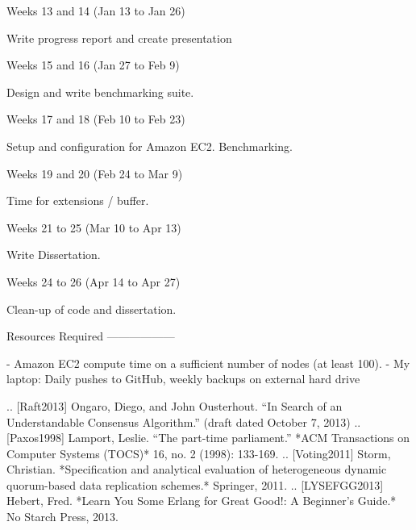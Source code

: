 Weeks 13 and 14 (Jan 13 to Jan 26)
~~~~~~~~~~~~~~~~~~~~~~~~~~~~~~~~~~

Write progress report and create presentation

Weeks 15 and 16 (Jan 27 to Feb 9)
~~~~~~~~~~~~~~~~~~~~~~~~~~~~~~~~~

Design and write benchmarking suite.

Weeks 17 and 18 (Feb 10 to Feb 23)
~~~~~~~~~~~~~~~~~~~~~~~~~~~~~~~~~~

Setup and configuration for Amazon EC2. Benchmarking.

Weeks 19 and 20 (Feb 24 to Mar 9)
~~~~~~~~~~~~~~~~~~~~~~~~~~~~~~~~~

Time for extensions / buffer.

Weeks 21 to 25 (Mar 10 to Apr 13)
~~~~~~~~~~~~~~~~~~~~~~~~~~~~~~~~~

Write Dissertation.

Weeks 24 to 26 (Apr 14 to Apr 27)
~~~~~~~~~~~~~~~~~~~~~~~~~~~~~~~~~

Clean-up of code and dissertation.

Resources Required
------------------

- Amazon EC2 compute time on a sufficient number of nodes (at least 100).
- My laptop: Daily pushes to GitHub, weekly backups on external hard drive

.. [Raft2013] Ongaro, Diego, and John Ousterhout. “In Search of an Understandable Consensus Algorithm.” (draft dated October 7, 2013)
.. [Paxos1998] Lamport, Leslie. “The part-time parliament.” *ACM Transactions on Computer Systems (TOCS)* 16, no. 2 (1998): 133-169.
.. [Voting2011] Storm, Christian. *Specification and analytical evaluation of heterogeneous dynamic quorum-based data replication schemes.* Springer, 2011.
.. [LYSEFGG2013] Hebert, Fred. *Learn You Some Erlang for Great Good!: A Beginner's Guide.* No Starch Press, 2013.
